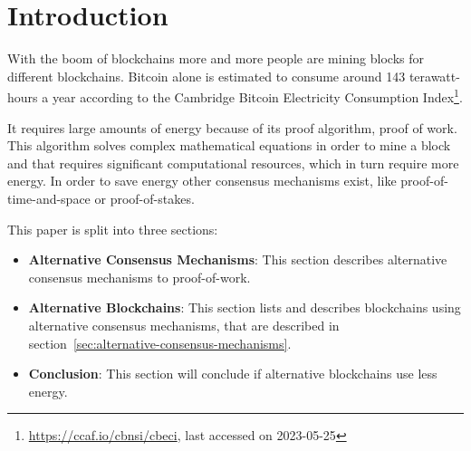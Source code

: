 
\section{Introduction}\label{sec:introduction}
With the boom of blockchains more and more people are mining blocks for different blockchains.
Bitcoin alone is estimated to consume around 143 terawatt-hours a year according to the Cambridge Bitcoin Electricity Consumption Index\footnote{\url{https://ccaf.io/cbnsi/cbeci}, last accessed on 2023-05-25}.

It requires large amounts of energy because of its proof algorithm, proof of work.\cite{why-does-bitcoin-use-so-much-energy}
This algorithm solves complex mathematical equations in order to mine a block and that requires significant computational resources, which in turn require more energy.
In order to save energy other consensus mechanisms exist, like proof-of-time-and-space or proof-of-stakes.

This paper is split into three sections:
\begin{itemize}
    \item\textbf{Alternative Consensus Mechanisms}: This section describes alternative consensus mechanisms to proof-of-work.
    \item\textbf{Alternative Blockchains}: This section lists and describes blockchains using alternative consensus mechanisms, that are described in section\ \ref{sec:alternative-consensus-mechanisms}.
    \item\textbf{Conclusion}: This section will conclude if alternative blockchains use less energy.
\end{itemize}
